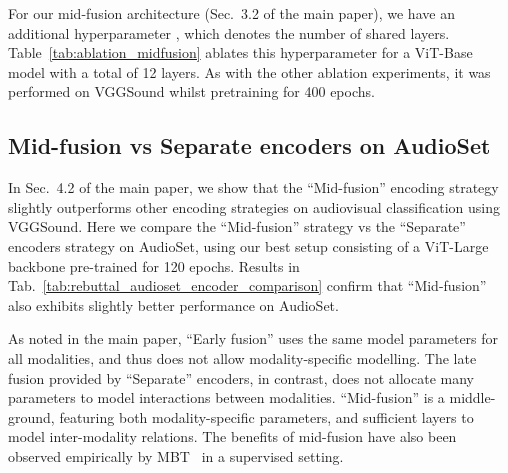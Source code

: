 \documentclass[10pt,twocolumn,letterpaper]{article}
\begin{document}
 
For our mid-fusion architecture (Sec.~3.2 of the main paper), we have an additional hyperparameter , which denotes the number of shared layers.
Table~\ref{tab:ablation_midfusion} ablates this hyperparameter for a ViT-Base model with a total of 12 layers.
As with the other ablation experiments, it was performed on VGGSound whilst pretraining for 400 epochs.




\subsection{Mid-fusion vs Separate encoders on AudioSet}
In Sec.~4.2 of the main paper, we show that the ``Mid-fusion'' encoding strategy slightly outperforms other encoding strategies on audiovisual classification using VGGSound.
Here we compare the ``Mid-fusion'' strategy vs the ``Separate'' encoders strategy on AudioSet, using our best setup consisting of a ViT-Large backbone pre-trained for 120 epochs.
Results in Tab.~\ref{tab:rebuttal_audioset_encoder_comparison} confirm that ``Mid-fusion'' also exhibits slightly better performance on AudioSet.

As noted in the main paper, ``Early fusion'' uses the same model parameters for all modalities, and thus does not allow modality-specific modelling.
The late fusion provided by ``Separate'' encoders, in contrast, does not allocate many parameters to model interactions between modalities.
``Mid-fusion'' is a middle-ground, featuring both modality-specific parameters, and sufficient layers to model inter-modality relations.
The benefits of mid-fusion have also been observed empirically by MBT~\cite{nagrani2021attention} in a supervised setting.
\begin{table}[t]
	\caption{Encoder architecture comparison on AudioSet. Large backbone pretrained for 120 epochs, using a ``Shared'' decoder.} 
	\vspace{-0.7\baselineskip}
	\centering
	\label{tab:rebuttal_audioset_encoder_comparison}
\end{table} 
\end{document}
